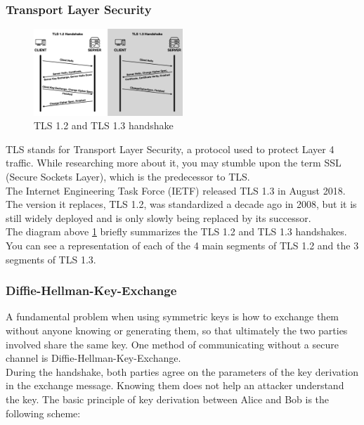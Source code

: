\subsubsection{Transport Layer Security}\cite{b38}

\begin{figure}[H] %
    \centering %
    \includegraphics[width=0.5\textwidth]{figures/TLS.png} %
    \caption{TLS 1.2 and TLS 1.3 handshake} %
    \label{Fig.2: TLS 1.2 and TLS 1.3 handshake} %
\end{figure}

TLS stands for Transport Layer Security, a protocol used to protect Layer 4 traffic. 
While researching more about it, you may stumble upon the term SSL (Secure Sockets Layer), 
which is the predecessor to TLS.
\\
The Internet Engineering Task Force (IETF) released TLS 1.3 in August 2018. The version it 
replaces, TLS 1.2, was standardized a decade ago in 2008, but it is still widely deployed 
and is only slowly being replaced by its successor.
\\
The diagram above \ref{Fig.2: TLS 1.2 and TLS 1.3 handshake} briefly summarizes the 
TLS 1.2 and TLS 1.3 handshakes. You can see a 
representation of each of the 4 main segments of TLS 1.2 and the 3 segments of TLS 1.3.

\subsubsection{Diﬃe-Hellman-Key-Exchange}\cite{b38}
A fundamental problem when using symmetric keys is how to exchange them without anyone 
knowing or generating them, so that ultimately the two parties involved share the same 
key. One method of communicating without a secure channel is Diﬃe-Hellman-Key-Exchange.
\\
During the handshake, both parties agree on the parameters of the key derivation in the 
exchange message. Knowing them does not help an attacker understand the key. The basic 
principle of key derivation between Alice and Bob is the following scheme:

